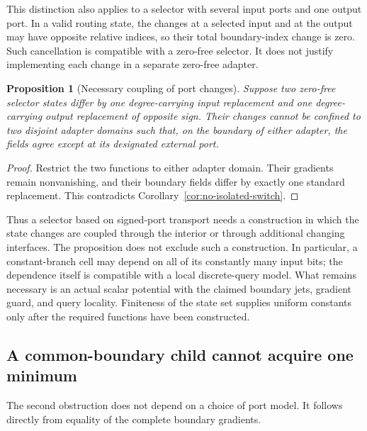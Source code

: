 \documentclass[11pt,a4paper]{article}
\newtheorem{proposition}[theorem]{Proposition}
\theoremstyle{definition}
\theoremstyle{remark}
\begin{document}
This distinction also applies to a selector with several input ports
and one output port.  In a valid routing state, the changes at a selected
input and at the output may have opposite relative indices, so their
total boundary-index change is zero.  Such cancellation is compatible
with a zero-free selector.  It does not justify implementing each change
in a separate zero-free adapter.

\begin{proposition}[Necessary coupling of port changes]
\label{prop:coupled-port-changes}
Suppose two zero-free selector states differ by one degree-carrying
input replacement and one degree-carrying output replacement of opposite
sign.  Their changes cannot be confined to two disjoint adapter domains
such that, on the boundary of either adapter, the fields agree except at
its designated external port.
\end{proposition}

\begin{proof}
Restrict the two functions to either adapter domain.  Their gradients
remain nonvanishing, and their boundary fields differ by exactly one
standard replacement.  This contradicts
Corollary~\ref{cor:no-isolated-switch}.
\end{proof}

Thus a selector based on signed-port transport needs a construction in
which the state changes are coupled through the interior or through
additional changing interfaces.  The proposition does not exclude such
a construction.  In particular, a constant-branch cell may depend on all
of its constantly many input bits; the dependence itself is compatible
with a local discrete-query model.  What remains necessary is an actual
scalar potential with the claimed boundary jets, gradient guard, and
query locality.  Finiteness of the state set supplies uniform constants
only after the required functions have been constructed.

\subsection{A common-boundary child cannot acquire one minimum}

The second obstruction does not depend on a choice of port model.
It follows directly from equality of the complete boundary gradients.
\end{document}
